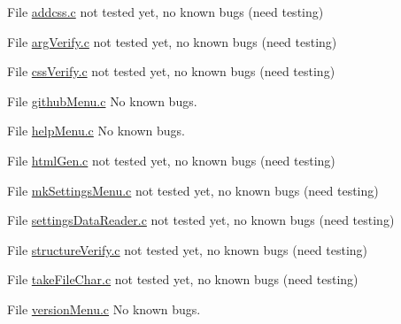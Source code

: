 
\begin{DoxyRefList}
\item[File \mbox{\hyperlink{addcss_8c}{addcss.c}} ]\label{bug__bug000001}%
%
not tested yet, no known bugs (need testing)  
\item[File \mbox{\hyperlink{argVerify_8c}{arg\+Verify.c}} ]\label{bug__bug000002}%
%
not tested yet, no known bugs (need testing)  
\item[File \mbox{\hyperlink{cssVerify_8c}{css\+Verify.c}} ]\label{bug__bug000003}%
%
not tested yet, no known bugs (need testing)  
\item[File \mbox{\hyperlink{githubMenu_8c}{github\+Menu.c}} ]\label{bug__bug000004}%
%
No known bugs.  
\item[File \mbox{\hyperlink{helpMenu_8c}{help\+Menu.c}} ]\label{bug__bug000005}%
%
No known bugs.  
\item[File \mbox{\hyperlink{htmlGen_8c}{html\+Gen.c}} ]\label{bug__bug000006}%
%
not tested yet, no known bugs (need testing) 
\item[File \mbox{\hyperlink{mkSettingsMenu_8c}{mk\+Settings\+Menu.c}} ]\label{bug__bug000007}%
%
not tested yet, no known bugs (need testing)  
\item[File \mbox{\hyperlink{settingsDataReader_8c}{settings\+Data\+Reader.c}} ]\label{bug__bug000008}%
%
not tested yet, no known bugs (need testing)  
\item[File \mbox{\hyperlink{structureVerify_8c}{structure\+Verify.c}} ]\label{bug__bug000009}%
%
not tested yet, no known bugs (need testing)  
\item[File \mbox{\hyperlink{takeFileChar_8c}{take\+File\+Char.c}} ]\label{bug__bug000010}%
%
not tested yet, no known bugs (need testing)  
\item[File \mbox{\hyperlink{versionMenu_8c}{version\+Menu.c}} ]\label{bug__bug000011}%
%
No known bugs. 
\end{DoxyRefList}